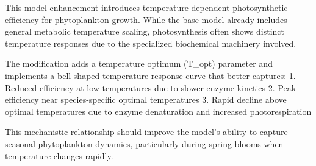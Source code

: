 This model enhancement introduces temperature-dependent photosynthetic efficiency for phytoplankton growth. While the base model already includes general metabolic temperature scaling, photosynthesis often shows distinct temperature responses due to the specialized biochemical machinery involved.

The modification adds a temperature optimum (T_opt) parameter and implements a bell-shaped temperature response curve that better captures:
1. Reduced efficiency at low temperatures due to slower enzyme kinetics
2. Peak efficiency near species-specific optimal temperatures 
3. Rapid decline above optimal temperatures due to enzyme denaturation and increased photorespiration

This mechanistic relationship should improve the model's ability to capture seasonal phytoplankton dynamics, particularly during spring blooms when temperature changes rapidly.
